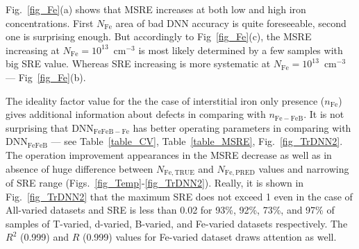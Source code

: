 \documentclass[num-refs]{wiley-article} %
\begin{document}
Fig.~\ref{fig_Fe}(a) shows that MSRE increases at both low and high iron concentrations.
First $N_\mathrm{Fe}$ area of bad DNN accuracy is quite foreseeable,
second one is surprising enough.
But accordingly to Fig~\ref{fig_Fe}(c), the MSRE increasing at $N_\mathrm{Fe}=10^{13}$~cm$^{-3}$ is most likely determined by  a few samples with big SRE value.
Whereas SRE increasing is more systematic at $N_\mathrm{Fe}=10^{13}$~cm$^{-3}$ --- Fig~\ref{fig_Fe}(b).

The ideality factor value for the the case of interstitial iron only presence ($n_\mathrm{Fe}$)
gives additional information about defects in comparing with $n_\mathrm{Fe-FeB}$.
It is not surprising that DNN$_\mathrm{FeFeB-Fe}$ has better operating parameters in comparing with
DNN$_\mathrm{FeFeB}$ --- see Table~\ref{table_CV}, Table~\ref{table_MSRE}, Fig.~\ref{fig_TrDNN2}.
The operation improvement appearances in the MSRE decrease as well as in
absence of huge difference between $N_\mathrm{Fe,TRUE}$ and $N_\mathrm{Fe,PRED}$ values
and narrowing of SRE range (Figs.~\ref{fig_Temp}-\ref{fig_TrDNN2}).
Really, it is shown in Fig.~\ref{fig_TrDNN2} that the maximum SRE does not exceed 1 even in the case of All-varied datasets
and SRE is less than 0.02 for 93\%, 92\%, 73\%, and 97\% of samples of T-varied, d-varied, B-varied, and Fe-varied datasets respectively.
The $R^2$ (0.999) and $R$ (0.999) values for Fe-varied dataset draws attention as well.
\end{document}
